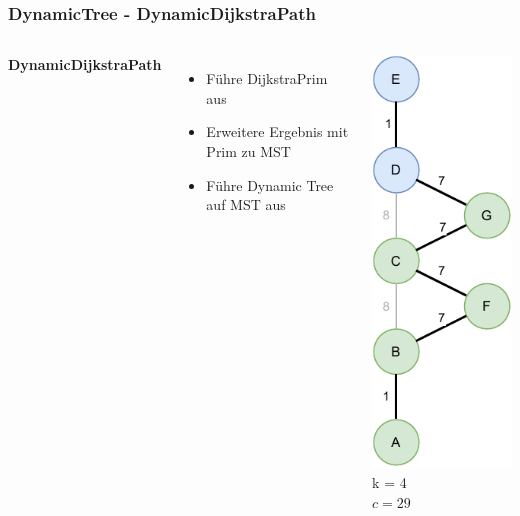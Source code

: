 \documentclass[aspectratio=169]{beamer}
\begin{document}
\begin{frame}
	\frametitle{DynamicTree - DynamicDijkstraPath}
	\begin{columns}[c] %
		
		\textbf{DynamicDijkstraPath}
		\begin{itemize}
			\item Führe DijkstraPrim aus
			\item Erweitere Ergebnis mit Prim zu MST
			\item Führe Dynamic Tree auf MST aus
		\end{itemize}
		\includegraphics[scale=.6]{dynamic_dijkstra.pdf}
		k = 4\\
		$c = 29$
		
		
	\end{columns}
	\end{frame}
	
\end{document}
